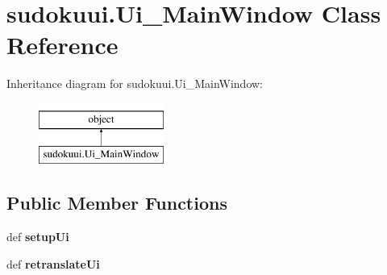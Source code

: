 \hypertarget{classsudokuui_1_1_ui___main_window}{\section{sudokuui.\-Ui\-\_\-\-Main\-Window Class Reference}
\label{classsudokuui_1_1_ui___main_window}
}
Inheritance diagram for sudokuui.\-Ui\-\_\-\-Main\-Window\-:\begin{figure}[H]
\begin{center}
\leavevmode
\includegraphics[height=2.000000cm]{classsudokuui_1_1_ui___main_window}
\end{center}
\end{figure}
\subsection*{Public Member Functions}
\begin{DoxyCompactItemize}
\item 
\hypertarget{classsudokuui_1_1_ui___main_window_af7d8582f64fe04816c4ea928b3601f9a}{def {\bfseries setup\-Ui}}\label{classsudokuui_1_1_ui___main_window_af7d8582f64fe04816c4ea928b3601f9a}

\item 
\hypertarget{classsudokuui_1_1_ui___main_window_a757ddd14ff06b39edc0d04a4d7e10a57}{def {\bfseries retranslate\-Ui}}\label{classsudokuui_1_1_ui___main_window_a757ddd14ff06b39edc0d04a4d7e10a57}

\end{DoxyCompactItemize}
